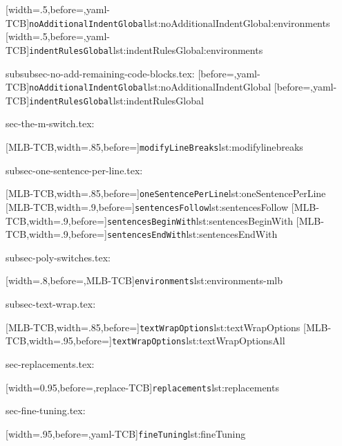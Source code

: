 [width=.5\linewidth,before=\centering,yaml-TCB]{\texttt{noAdditionalIndentGlobal}}{lst:noAdditionalIndentGlobal:environments}
[width=.5\linewidth,before=\centering,yaml-TCB]{\texttt{indentRulesGlobal}}{lst:indentRulesGlobal:environments}

subsubsec-no-add-remaining-code-blocks.tex:
[before=\centering,yaml-TCB]{\texttt{noAdditionalIndentGlobal}}{lst:noAdditionalIndentGlobal}
[before=\centering,yaml-TCB]{\texttt{indentRulesGlobal}}{lst:indentRulesGlobal}

sec-the-m-switch.tex:

[MLB-TCB,width=.85\linewidth,before=\centering]{\texttt{modifyLineBreaks}}{lst:modifylinebreaks}

subsec-one-sentence-per-line.tex:

[MLB-TCB,width=.85\linewidth,before=\centering]{\texttt{oneSentencePerLine}}{lst:oneSentencePerLine}
[MLB-TCB,width=.9\linewidth,before=\centering]{\texttt{sentencesFollow}}{lst:sentencesFollow}
[MLB-TCB,width=.9\linewidth,before=\centering]{\texttt{sentencesBeginWith}}{lst:sentencesBeginWith}
[MLB-TCB,width=.9\linewidth,before=\centering]{\texttt{sentencesEndWith}}{lst:sentencesEndWith}

subsec-poly-switches.tex:

[width=.8\linewidth,before=\centering,MLB-TCB]{\texttt{environments}}{lst:environments-mlb}

subsec-text-wrap.tex:

[MLB-TCB,width=.85\linewidth,before=\centering]{\texttt{textWrapOptions}}{lst:textWrapOptions}
[MLB-TCB,width=.95\linewidth,before=\centering]{\texttt{textWrapOptions}}{lst:textWrapOptionsAll}

sec-replacements.tex:

[width=0.95\linewidth,before=\centering,replace-TCB]{\texttt{replacements}}{lst:replacements}

sec-fine-tuning.tex:

[width=.95\linewidth,before=\centering,yaml-TCB]{\texttt{fineTuning}}{lst:fineTuning}
